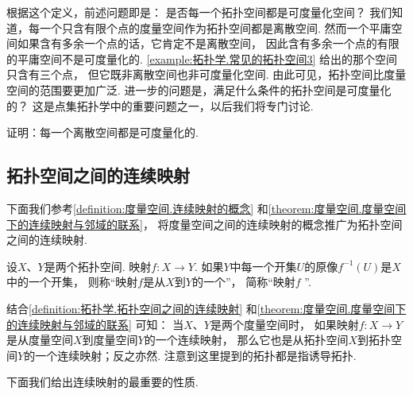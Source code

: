 根据这个定义，前述问题即是：
是否每一个拓扑空间都是可度量化空间？
我们知道，每一个只含有限个点的度量空间作为拓扑空间都是离散空间.
然而一个平庸空间如果含有多余一个点的话，它肯定不是离散空间，
因此含有多余一个点的有限的平庸空间不是可度量化的.
\cref{example:拓扑学.常见的拓扑空间3} 给出的那个空间只含有三个点，
但它既非离散空间也非可度量化空间.
由此可见，拓扑空间比度量空间的范围要更加广泛.
进一步的问题是，满足什么条件的拓扑空间是可度量化的？
这是点集拓扑学中的重要问题之一，以后我们将专门讨论.

\begin{example}
证明：每一个离散空间都是可度量化的.
\end{example}

\subsection{拓扑空间之间的连续映射}
下面我们参考\cref{definition:度量空间.连续映射的概念}
和\cref{theorem:度量空间.度量空间下的连续映射与邻域的联系}，
将度量空间之间的连续映射的概念推广为拓扑空间之间的连续映射.

\begin{definition}\label{definition:拓扑学.拓扑空间之间的连续映射}
设\(X\)、\(Y\)是两个拓扑空间.
映射\(f\colon X \to Y\).
如果\(Y\)中每一个开集\(U\)的原像\(f^{-1}(U)\)是\(X\)中的一个开集，
则称“映射\(f\)是从\(X\)到\(Y\)的一个”，
简称“映射\(f\) ”.
\end{definition}
结合\cref{definition:拓扑学.拓扑空间之间的连续映射}
和\cref{theorem:度量空间.度量空间下的连续映射与邻域的联系} 可知：
当\(X\)、\(Y\)是两个度量空间时，
如果映射\(f\colon X \to Y\)是从度量空间\(X\)到度量空间\(Y\)的一个连续映射，
那么它也是从拓扑空间\(X\)到拓扑空间\(Y\)的一个连续映射；反之亦然.
注意到这里提到的拓扑都是指诱导拓扑.

下面我们给出连续映射的最重要的性质.

